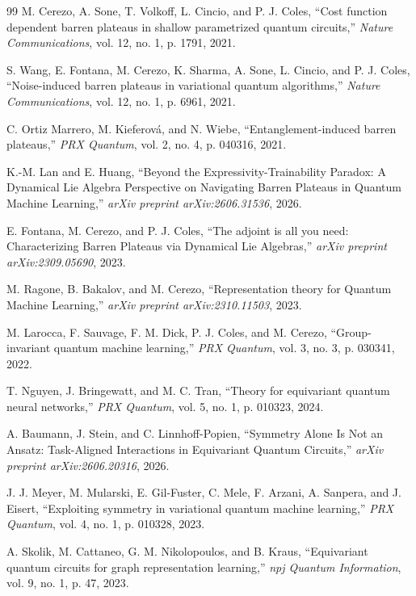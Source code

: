 \documentclass[10pt,twocolumn]{article}
\theoremstyle{remark}
\begin{document}
\begin{thebibliography}{99}
M. Cerezo, A. Sone, T. Volkoff, L. Cincio, and P. J. Coles, ``Cost function dependent barren plateaus in shallow parametrized quantum circuits,'' \textit{Nature Communications}, vol. 12, no. 1, p. 1791, 2021.

S. Wang, E. Fontana, M. Cerezo, K. Sharma, A. Sone, L. Cincio, and P. J. Coles, ``Noise-induced barren plateaus in variational quantum algorithms,'' \textit{Nature Communications}, vol. 12, no. 1, p. 6961, 2021.

C. Ortiz Marrero, M. Kieferov{\'a}, and N. Wiebe, ``Entanglement-induced barren plateaus,'' \textit{PRX Quantum}, vol. 2, no. 4, p. 040316, 2021.

K.-M. Lan and E. Huang, ``Beyond the Expressivity-Trainability Paradox: A Dynamical Lie Algebra Perspective on Navigating Barren Plateaus in Quantum Machine Learning,'' \textit{arXiv preprint arXiv:2606.31536}, 2026.

E. Fontana, M. Cerezo, and P. J. Coles, ``The adjoint is all you need: Characterizing Barren Plateaus via Dynamical Lie Algebras,'' \textit{arXiv preprint arXiv:2309.05690}, 2023.

M. Ragone, B. Bakalov, and M. Cerezo, ``Representation theory for Quantum Machine Learning,'' \textit{arXiv preprint arXiv:2310.11503}, 2023.

M. Larocca, F. Sauvage, F. M. Dick, P. J. Coles, and M. Cerezo, ``Group-invariant quantum machine learning,'' \textit{PRX Quantum}, vol. 3, no. 3, p. 030341, 2022.

T. Nguyen, J. Bringewatt, and M. C. Tran, ``Theory for equivariant quantum neural networks,'' \textit{PRX Quantum}, vol. 5, no. 1, p. 010323, 2024.

A. Baumann, J. Stein, and C. Linnhoff-Popien, ``Symmetry Alone Is Not an Ansatz: Task-Aligned Interactions in Equivariant Quantum Circuits,'' \textit{arXiv preprint arXiv:2606.20316}, 2026.

J. J. Meyer, M. Mularski, E. Gil-Fuster, C. Mele, F. Arzani, A. Sanpera, and J. Eisert, ``Exploiting symmetry in variational quantum machine learning,'' \textit{PRX Quantum}, vol. 4, no. 1, p. 010328, 2023.

A. Skolik, M. Cattaneo, G. M. Nikolopoulos, and B. Kraus, ``Equivariant quantum circuits for graph representation learning,'' \textit{npj Quantum Information}, vol. 9, no. 1, p. 47, 2023.


\end{thebibliography}
\end{document}
